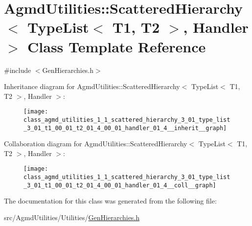 \hypertarget{class_agmd_utilities_1_1_scattered_hierarchy_3_01_type_list_3_01_t1_00_01_t2_01_4_00_01_handler_01_4}{\section{Agmd\+Utilities\+:\+:Scattered\+Hierarchy$<$ Type\+List$<$ T1, T2 $>$, Handler $>$ Class Template Reference}
\label{class_agmd_utilities_1_1_scattered_hierarchy_3_01_type_list_3_01_t1_00_01_t2_01_4_00_01_handler_01_4}
}


{\ttfamily \#include $<$Gen\+Hierarchies.\+h$>$}



Inheritance diagram for Agmd\+Utilities\+:\+:Scattered\+Hierarchy$<$ Type\+List$<$ T1, T2 $>$, Handler $>$\+:\nopagebreak
\begin{figure}[H]
\begin{center}
\leavevmode
\texttt{[image: class\_agmd\_utilities\_1\_1\_scattered\_hierarchy\_3\_01\_type\_list\_3\_01\_t1\_00\_01\_t2\_01\_4\_00\_01\_handler\_01\_4\_\_inherit\_\_graph]}
\end{center}
\end{figure}


Collaboration diagram for Agmd\+Utilities\+:\+:Scattered\+Hierarchy$<$ Type\+List$<$ T1, T2 $>$, Handler $>$\+:\nopagebreak
\begin{figure}[H]
\begin{center}
\leavevmode
\texttt{[image: class\_agmd\_utilities\_1\_1\_scattered\_hierarchy\_3\_01\_type\_list\_3\_01\_t1\_00\_01\_t2\_01\_4\_00\_01\_handler\_01\_4\_\_coll\_\_graph]}
\end{center}
\end{figure}


The documentation for this class was generated from the following file\+:\begin{DoxyCompactItemize}
\item 
src/\+Agmd\+Utilities/\+Utilities/\hyperlink{_gen_hierarchies_8h}{Gen\+Hierarchies.\+h}\end{DoxyCompactItemize}

